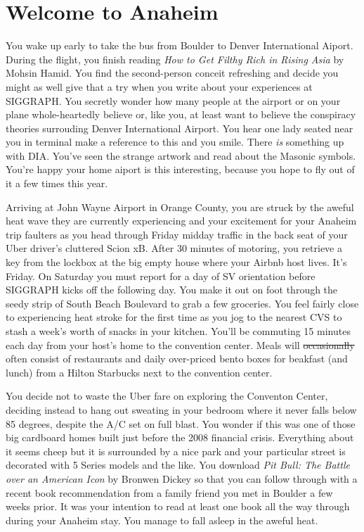 \documentclass[../main.tex]{subfiles}
\begin{document}
\section{Welcome to Anaheim}

You wake up early to take the bus from Boulder to Denver International Aiport. During the flight, you finish reading \textit{How to Get Filthy Rich in Rising Asia} by Mohsin Hamid. You find the second-person conceit refreshing and decide you might as well give that a try when you write about your experiences at SIGGRAPH. You secretly wonder how many people at the airport or on your plane whole-heartedly believe or, like you, at least want to believe the conspiracy theories surrouding Denver International Airport. You hear one lady seated near you in terminal make a reference to this and you smile. There \textit{is} something up with DIA. You've seen the strange artwork and read about the Masonic symbols. You're happy your home aiport is this interesting, because you hope to fly out of it a few times this year.

Arriving at John Wayne Airport in Orange County, you are struck by the aweful heat wave they are currently experiencing and your excitement for your Anaheim trip faulters as you head through Friday midday traffic in the back seat of your Uber driver's cluttered Scion xB. After 30 minutes of motoring, you retrieve a key from the lockbox at the big empty house where your Airbnb host lives. It's Friday. On Saturday you must report for a day of SV orientation before SIGGRAPH kicks off the following day. You make it out on foot through the seedy strip of South Beach Boulevard to grab a few groceries. You feel fairly close to experiencing heat stroke for the first time as you jog to the nearest CVS to stash a week's worth of snacks in your kitchen. You'll be commuting 15 minutes each day from your host's home to the convention center. Meals will \sout{occasionally} often consist of restaurants and daily over-priced bento boxes for beakfast (and lunch) from a Hilton Starbucks next to the convention center.

You decide not to waste the Uber fare on exploring the Conventon Center, deciding instead to hang out sweating in your bedroom where it never falls below 85 degrees, despite the A/C set on full blast. You wonder if this was one of those big cardboard homes built just before the 2008 financial crisis. Everything about it seems cheep but it is surrounded by a nice park and your particular street is decorated with 5 Series models and the like. You download \textit{Pit Bull: The Battle over an American Icon} by Bronwen Dickey so that you can follow through with a recent book recommendation from a family friend you met in Boulder a few weeks prior. It was your intention to read at least one book all the way through during your Anaheim stay. You manage to fall asleep in the aweful heat.
 
\end{document}
